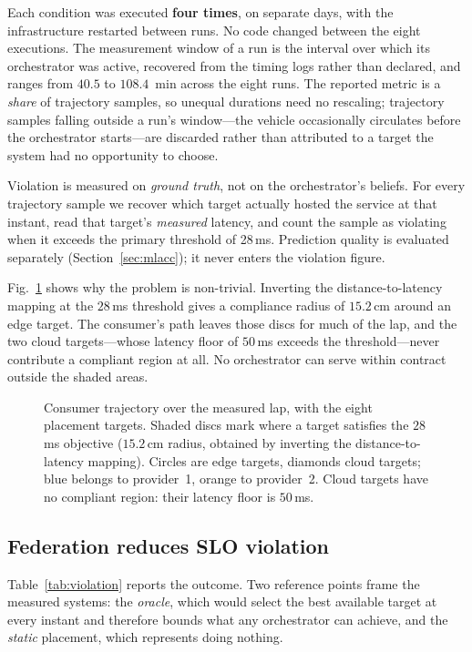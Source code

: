 \documentclass[conference]{IEEEtran}
\begin{document}
Each condition was executed \textbf{four times}, on separate days, with the
infrastructure restarted between runs. No code changed between the eight
executions. The measurement window of a run is the
interval over which its orchestrator was active, recovered from the timing
logs rather than declared, and ranges from $40.5$ to $108.4$~min across the
eight runs. The reported metric is a \emph{share} of trajectory samples, so
unequal durations need no rescaling; trajectory samples falling outside a
run's window---the vehicle occasionally circulates before the orchestrator
starts---are discarded rather than attributed to a target the system had no
opportunity to choose.

Violation is measured on \emph{ground truth}, not on the orchestrator's
beliefs. For every trajectory sample we recover which target actually hosted
the service at that instant, read that target's \emph{measured} latency, and
count the sample as violating when it exceeds the primary threshold of
28\,ms. Prediction quality is evaluated separately
(Section~\ref{sec:mlacc}); it never enters the violation figure.

Fig.~\ref{fig:trajectory} shows why the problem is non-trivial. Inverting the
distance-to-latency mapping at the $28$\,ms threshold gives a compliance
radius of $15.2$\,cm around an edge target. The consumer's path leaves those
discs for much of the lap, and the two cloud targets---whose latency floor of
$50$\,ms exceeds the threshold---never contribute a compliant region at all.
No orchestrator can serve within contract outside the shaded areas.

\begin{figure}[t]
\centering
\resizebox{0.92\columnwidth}{!}{}
\caption{Consumer trajectory over the measured lap, with the eight placement
targets. Shaded discs mark where a target satisfies the $28$\,ms objective
($15.2$\,cm radius, obtained by inverting the distance-to-latency mapping).
Circles are edge targets, diamonds cloud targets; blue belongs to provider~1,
orange to provider~2. Cloud targets have no compliant region: their latency
floor is $50$\,ms.}
\label{fig:trajectory}
\end{figure}

\subsection{Federation reduces SLO violation}
\label{sec:violation}

Table~\ref{tab:violation} reports the outcome. Two reference points frame the
measured systems: the \emph{oracle}, which would select the best available
target at every instant and therefore bounds what any orchestrator can
achieve, and the \emph{static} placement, which represents doing nothing.
\end{document}
